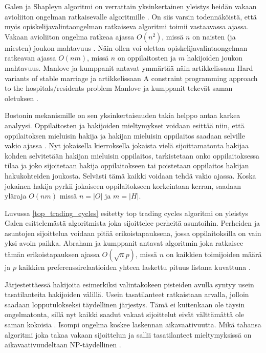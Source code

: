 \documentclass[gradu, twoside]{tktltiki}
\begin{document}
Galen ja Shapleyn algoritmi on verrattain yksinkertainen yleistys
heidän vakaan avioliiton ongelman ratkaisevalle algoritmille
\cite{gusfield89}. On siis varsin todennäköistä, että myös
opiskelijavalintaongelman ratkaiseva algoritmi toimii vastaavassa
ajassa. Vakaan avioliiton ongelma ratkeaa ajassa $O(n^2)$, missä $n$
on naisten (ja miesten) joukon mahtavuus \cite{gusfield89}. Näin ollen
voi olettaa opiskelijavalintaongelman ratkeavan ajassa $O(nm)$, missä
$n$ on oppilaitosten ja $m$ hakijoiden joukon mahtavuus. Manlove ja
kumppanit antavat ymmärtää näin artikkelissaan Hard variants of stable
marriage \cite{manlove02} ja artikkelissaan A constraint programming
approach to the hospitals/residents problem Manlove ja kumppanit
tekevät saman oletuksen \cite{manlove07}.

Bostonin mekanismille on sen yksinkertaisuuden takia helppo antaa
karkea analyysi. Oppilaitosten ja hakijoiden mieltymykset voidaan
esittää niin, että oppilaitoksen mieluisin hakija ja hakijan mieluisin
oppilaitos saadaan selville vakio ajassa \cite{gusfield89}. Nyt
jokaisella kierroksella jokaista vielä sijoittamatonta hakijaa kohden
selvitetään hakijan mieluisin oppilaitos, tarkistetaan onko
oppilaitoksessa tilaa ja joko sijoitetaan hakija oppilaitokseen tai
poistetaan oppilaitos hakijan hakukohteiden joukosta. Selvästi tämä
kaikki voidaan tehdä vakio ajassa. Koska jokainen hakija pyrkii
jokaiseen oppilaitokseen korkeintaan kerran, saadaan yläraja $O(nm)$
missä $n = |O|$ ja $m = |H|$.

\enlargethispage{\baselineskip}
Luvussa \ref{top_trading_cycles} esitetty top trading cycles algoritmi
on yleistys Galen esittelemästä algoritmista joka sijoittelee perheitä
asuntoihin. Perheiden ja asuntojen sijoittelua voidaan pitää
erikoistapauksena, jossa oppilaitoksilla on vain yksi avoin paikka.
Abraham ja kumppanit antavat algoritmin joka ratkaisee tämän
erikoistapauksen ajassa $O(\sqrt np)$, missä $n$ on kaikkien
toimijoiden määrä ja $p$ kaikkien preferenssirelaatioiden yhteen
laskettu pituus listana kuvattuna \cite{abraham05}.

Järjestettäessä hakijoita esimerkiksi valintakokeen pisteiden avulla
syntyy usein tasatilanteita hakijoiden välillä. Usein tasatilanteet
ratkaistaan arvalla, jolloin saadaan lopputulokseksi täydellinen
järjestys. Tämä ei kuitenkaan ole täysin ongelmatonta, sillä nyt
kaikki saadut vakaat sijoittelut eivät välttämättä ole saman kokoisia
\cite{manlove02}. Isompi ongelma koskee laskennan aikavaativuutta.
Mikä tahansa algoritmi joka takaa vakaan sijoittelun ja sallii
tasatilanteet mieltymyksissä on aikavaativuudeltaan NP-täydellinen
\cite{manlove02}.
\end{document}
